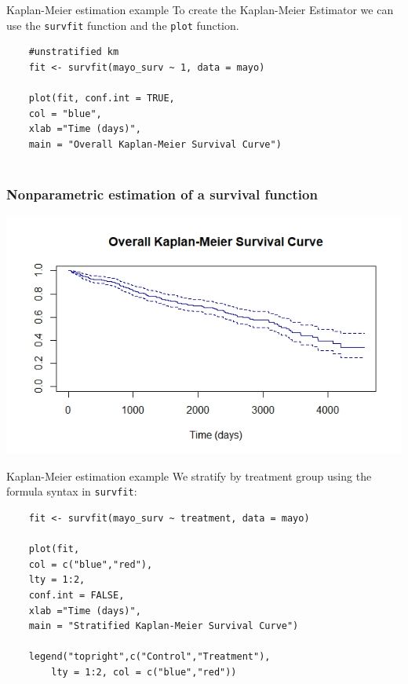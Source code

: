 \documentclass[10pt,t]{beamer}
\begin{document}
\begin{frame}[fragile]{Kaplan-Meier estimation example}
	To create the Kaplan-Meier Estimator we can use the \texttt{survfit} function and the \texttt{plot} function.
	
	
	\begin{verbatim}
	#unstratified km
	fit <- survfit(mayo_surv ~ 1, data = mayo)
	
	plot(fit, conf.int = TRUE,
	col = "blue",
	xlab ="Time (days)",
	main = "Overall Kaplan-Meier Survival Curve")
	
	\end{verbatim}
	
	
\end{frame}




\begin{frame}
\frametitle{Nonparametric estimation of a survival function} 
\begin{center}
\includegraphics[width=\textwidth]{figs/r_km_overall}
\end{center}
\end{frame}

\begin{frame}[fragile]{Kaplan-Meier estimation example}
	We stratify by treatment group using the formula syntax in \texttt{survfit}:
	\begin{verbatim}
	fit <- survfit(mayo_surv ~ treatment, data = mayo)
	
	plot(fit, 
	col = c("blue","red"),
	lty = 1:2,
	conf.int = FALSE,
	xlab ="Time (days)",
	main = "Stratified Kaplan-Meier Survival Curve")
	
	legend("topright",c("Control","Treatment"),
	    lty = 1:2, col = c("blue","red"))
	\end{verbatim}
\end{frame}
\end{document}
